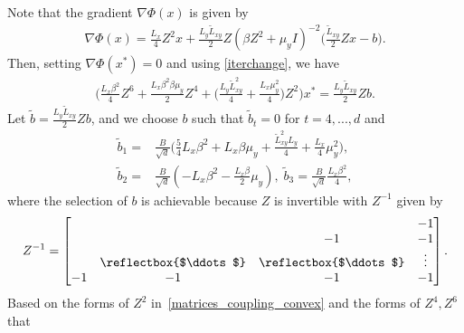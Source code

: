 \documentclass{osudissert96}
\begin{document}
\vspace{0.2cm}
\vspace{0.2cm}

Note that 
the gradient $\nabla \Phi(x)$ is given by 
\begin{align}\label{conv_gdform}
\nabla \Phi(x) =  \frac{L_x}{4} Z^2 x + \frac{L_y\widetilde L_{xy}}{2} Z (\beta Z^2 +\mu_y I)^{-2}\Big(\frac{\widetilde L_{xy}}{2} Zx-b\Big). 
\end{align}
Then, setting $\nabla \Phi(x^*) = 0$ and using \cref{iterchange}, we have 
\begin{align}\label{x_star_convex}
\Big (\frac{L_x\beta^2}{4} Z^6 +  \frac{L_x\beta^2\beta\mu_y}{2} Z^4 +\Big (\frac{L_y\widetilde L_{xy}^2}{4}+\frac{L_x\mu_y^2}{4}\Big) Z^2 \Big) x^* =  \frac{L_y\widetilde L_{xy}}{2} Zb. 
\end{align}
Let $\widetilde b =\frac{L_y\widetilde L_{xy}}{2} Zb$, and we choose $b$ such that $\widetilde b_t = 0$ for $t=4,...,d$ and 
\begin{align}\label{de:bwidetilde}
\widetilde b_1 = &\frac{B}{\sqrt{d}} \Big( \frac{5}{4} L_x\beta^2+ L_x \beta\mu_y+ \frac{\widetilde L^2_{xy}L_y}{4}+\frac{L_x}{4} \mu_y^2\Big), \nonumber
\\ \widetilde b_2 =& \frac{B}{\sqrt{d}} (-L_x \beta^2 -\frac{L_x\beta }{2}\mu_y),\; \widetilde b_3 = \frac{B}{\sqrt{d}} \frac{L_x\beta^2}{4},
\end{align}
where the selection of $b$ is achievable because $Z$ is invertible with $Z^{-1}$ given by 
\begin{align*}
Z^{-1}= \begin{bmatrix}
 &   &  & -1\\
 &  &  -1& -1  \\
  &\text{\reflectbox{$\ddots$}} &\text{\reflectbox{$\ddots
  $}} & \vdots \\
  -1& -1  &-1  &-1 \\ 
\end{bmatrix}.
\end{align*}
Based on the forms of $Z^2$ in~\cref{matrices_coupling_convex} and the forms of $Z^4, Z^6$ that 
\end{document}
